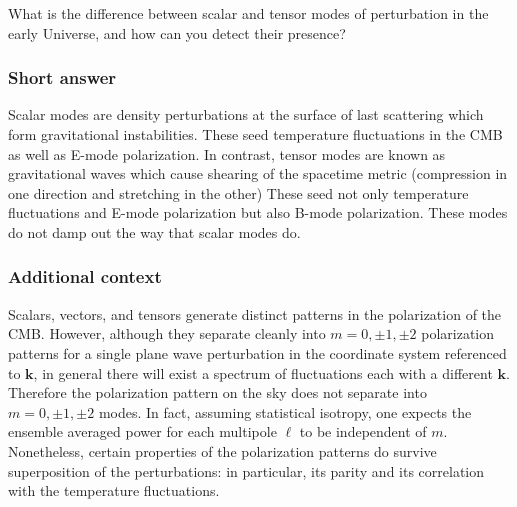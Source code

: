 \documentclass[a4paper,11pt]{article}
\begin{document}
What is the difference between scalar and tensor modes of perturbation in the early Universe, and how can you detect their presence?

\subsubsection{Short answer}

Scalar modes are density perturbations at the surface of last scattering which form gravitational instabilities. These seed temperature fluctuations in the CMB as well as E-mode polarization. In contrast, tensor modes are known as gravitational waves which cause shearing of the spacetime metric (compression in one direction and stretching in the other) These seed not only temperature fluctuations and E-mode polarization but also B-mode polarization. These modes do not damp out the way that scalar modes do. 

\subsubsection{Additional context}

{\noindent}Scalars, vectors, and tensors generate distinct patterns in the polarization of the CMB. However, although they separate cleanly into $m=0,\pm1,\pm2$ polarization patterns for a single plane wave perturbation in the coordinate system referenced to $\bm{k}$, in general there will exist a spectrum of fluctuations each with a different $\bm{k}$. Therefore the polarization pattern on the sky does not separate into $m=0,\pm1,\pm2$ modes. In fact, assuming statistical isotropy, one expects the ensemble averaged power for each multipole $\ell$ to be independent of $m$. Nonetheless, certain properties of the polarization patterns do survive superposition of the perturbations: in particular, its parity and its correlation with the temperature fluctuations.
\end{document}
